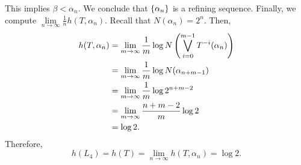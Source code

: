 \documentclass[12pt,twoside,draft]{book}
\begin{document}
This implies $\beta < \alpha_n$.
We conclude that $\left \{ \alpha_n \right \}$ is a refining sequence.
Finally, we compute $\lim\limits_{n \to \infty} \frac{1}{n} h(T, \alpha_n)$.
Recall that $N(\alpha_{n}) = 2^n$.
Then,
\begin{align*}
  h(T, \alpha_n)
  &= \lim\limits_{m \to \infty} \frac{1}{m} \log N\left (  \bigvee\limits_{i = 0}^{m-1} T^{-i}(\alpha_n) \right )  \\
  &= \lim\limits_{m \to \infty} \frac{1}{m} \log N(\alpha_{n+m-1})  \\
  &= \lim\limits_{m \to \infty} \frac{1}{m} \log 2^{n + m - 2}  \\
  &= \lim\limits_{m \to \infty} \frac{n + m - 2}{m} \log 2 \\
  &= \log 2.
\end{align*}
Therefore,
\begin{equation*}
  h(L_4) = h(T) = \lim\limits_{n \to \infty} h(T, \alpha_n) = \log 2.
\end{equation*}




\printindex
\end{document}
